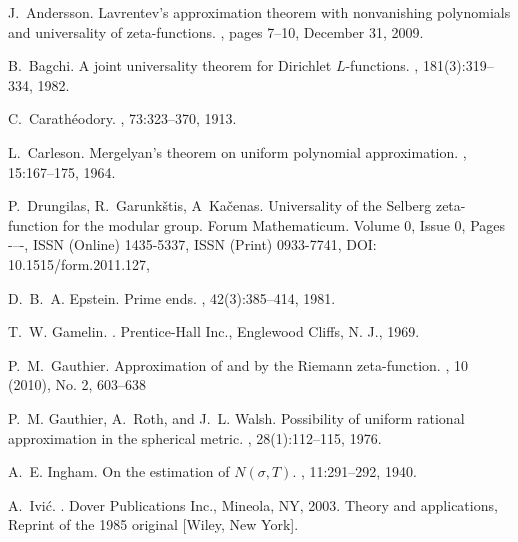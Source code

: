 \documentclass[11pt]{article}
\begin{document}

\begin{thebibliography}{21}

J.~Andersson.
\newblock Lavrent{\cprime}ev's approximation theorem with nonvanishing
  polynomials and universality of zeta-functions.
, pages 7--10, December 31, 2009.

B.~Bagchi.
\newblock A joint universality theorem for {D}irichlet {$L$}-functions.
, 181(3):319--334, 1982.

C.~Carath\'eodory.
, 73:323--370, 1913.

L.~Carleson.
\newblock Mergelyan's theorem on uniform polynomial approximation.
, 15:167--175, 1964.

P.~Drungilas, R.~Garunk{\v{s}}tis, A~Ka{\v{c}}enas.
\newblock Universality of the Selberg zeta-function for the modular group.
\newblock Forum Mathematicum. Volume 0, Issue 0, Pages -–-, ISSN (Online) 1435-5337, ISSN (Print) 0933-7741, DOI: 10.1515/form.2011.127, 


D.~B.~A. Epstein.
\newblock Prime ends.
, 42(3):385--414, 1981.

T.~W. Gamelin.
.
\newblock Prentice-Hall Inc., Englewood Cliffs, N. J., 1969.

P.~M.~Gauthier.
\newblock Approximation of and by the {R}iemann zeta-function.
, 10 (2010), No. 2, 603--638 


P.~M. Gauthier, A.~Roth, and J.~L. Walsh.
\newblock Possibility of uniform rational approximation in the spherical
  metric.
, 28(1):112--115, 1976.

A.~E. Ingham.
\newblock On the estimation of {$N(\sigma,T)$}.
, 11:291--292, 1940.

A.~Ivi{\'c}.
.
\newblock Dover Publications Inc., Mineola, NY, 2003.
\newblock Theory and applications, Reprint of the 1985 original [Wiley, New
  York].


\end{thebibliography}
\end{document}

